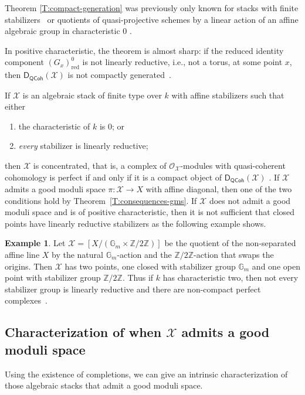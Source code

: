 \documentclass[a4paper]{amsart}
\theoremstyle{plain}
\theoremstyle{definition}
\newtheorem{example}[theorem]{Example}
\theoremstyle{remark}
\numberwithin{equation}{section}
\newcommand{\GG}{\mathbb{G}}
\newcommand{\red}{\mathrm{red}}
\newcommand\ZZ{\mathbb{Z}}
\newcommand\cX{\mathcal{X}}
\newcommand\oh{\mathcal{O}}
\newcommand{\QCoh}{\mathsf{QCoh}}
\newcommand{\DCAT}{\mathsf{D}}
\newcommand{\DQCOH}{\DCAT_{\QCoh}}
\begin{document}
Theorem \ref{T:compact-generation} was previously only known for stacks with finite stabilizers~\cite[Thm.~A]{perfect_complexes_stacks} or quotients of quasi-projective schemes by a linear action of an affine algebraic group in characteristic $0$ \cite[Cor.~3.22]{BZFN}.

In positive characteristic, the theorem is almost sharp: if the reduced
identity component $(G_x)^0_\red$ is not linearly reductive, i.e., not a torus,
at some point $x$, then $\DQCOH(\cX)$ is not compactly
generated~\cite[Thm.~1.1]{hallj_neeman_dary_no_compacts}.

If $\cX$ is an algebraic stack of finite type over $k$ with affine stabilizers such that either
\begin{enumerate}
\item the characteristic of $k$ is $0$; or
\item \emph{every} stabilizer is linearly reductive;
\end{enumerate}
then $\cX$ is concentrated, that is, a complex of $\oh_{\cX}$-modules with quasi-coherent cohomology is perfect if and only if it is a compact object of $\DQCOH(\cX)$ \cite[Thm.~C]{hallj_dary_alg_groups_classifying}.
If $\cX$ admits a good moduli space $\pi\colon \cX\to X$ with affine diagonal,
then one of the two conditions hold by Theorem~\ref{T:consequences-gms}.
If $\cX$ does not admit a good moduli space and is of positive characteristic,
then it is not sufficient that closed points have linearly reductive
stabilizers as the following example shows.
\begin{example}
Let $\cX=[X/(\GG_m\times \ZZ/2\ZZ)]$ be the quotient of the non-separated affine
line $X$ by the natural $\GG_m$-action and the $\ZZ/2\ZZ$-action that swaps the
origins. Then $\cX$ has two points, one closed with stabilizer group $\GG_m$
and one open point with stabilizer group $\ZZ/2\ZZ$. Thus if $k$ has
characteristic two, then not every stabilizer group is linearly reductive and
there are non-compact perfect
complexes~\cite[Thm.~C]{hallj_dary_alg_groups_classifying}.
\end{example}


\subsection{Characterization of when $\cX$ admits a good moduli space} \label{A:gms}

Using the existence of completions, we can give an intrinsic characterization of those algebraic stacks that admit a good moduli space.
\end{document}
